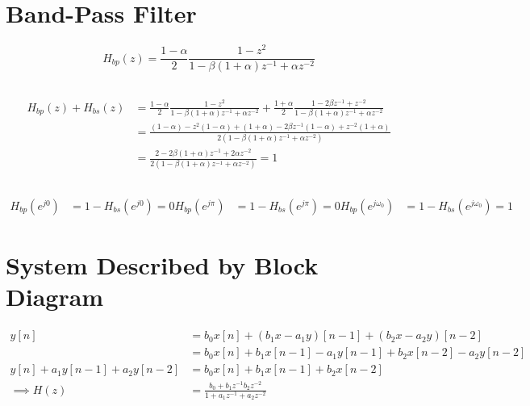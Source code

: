 \documentclass{article}
\begin{document}
\section{Band-Pass Filter}

\begin{equation}
    H_{bp}(z) = \frac{1 - \alpha}{2} \frac{1 - z^2}{1 - \beta (1 + \alpha) z^{-1} + \alpha z^{-2}}
\end{equation}

\subsection{}

\begin{align}
    H_{bp}(z) + H_{bs}(z) &= \frac{1 - \alpha}{2} \frac{1 - z^2}{1 - \beta (1 + \alpha) z^{-1} + \alpha z^{-2}} + \frac{1 + \alpha}{2} \frac{1 - 2\beta z^{-1} + z^{-2}}{1 - \beta (1 + \alpha) z^{-1} + \alpha z^{-2}} \\
    &= \frac{(1 - \alpha) - z^2 (1 - \alpha) + (1 + \alpha) - 2\beta z^{-1} (1 - \alpha) + z^{-2} (1 + \alpha)}{2 (1 - \beta (1 + \alpha) z^{-1} + \alpha z^{-2})} \\
    &= \frac{2 - 2 \beta (1 + \alpha) z^{-1} + 2\alpha z^{-2}}{2 (1 - \beta (1 + \alpha) z^{-1} + \alpha z^{-2})} = 1
\end{align}

\subsection{}

\begin{align}
    H_{bp}(e^{j 0}) &= 1 - H_{bs}(e^{j 0}) = 0
    H_{bp}(e^{j \pi}) &= 1 - H_{bs}(e^{j \pi}) = 0
    H_{bp}(e^{j \omega_0}) &= 1 - H_{bs}(e^{j \omega_0}) = 1
\end{align}

\section{System Described by Block Diagram}

\begin{align}
    y[n] &= b_0 x[n] + (b_1 x - a_1 y)[n - 1] + (b_2 x - a_2 y)[n - 2] \\
    &= b_0 x[n] + b_1 x[n - 1] - a_1 y[n - 1] + b_2 x[n - 2] - a_2 y[n - 2] \\
    y[n] + a_1 y[n - 1] + a_2 y[n - 2] &= b_0 x[n] + b_1 x[n - 1] + b_2 x[n - 2] \\
    \implies H(z) &= \frac{b_0 + b_1 z^{-1} b_2 z^{-2}}{1 + a_1 z^{-1} + a_2 z^{-2}}
\end{align}
\end{document}
